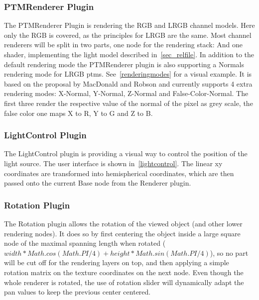 \subsubsection{PTMRenderer Plugin}\label{sec_ptmrender}
The PTMRenderer Plugin is rendering the RGB and LRGB channel
models. Here only the RGB is covered, as the principles for LRGB are the same.
Most channel renderers will be split in two parts, one node for the rendering
stack:
And one shader, implementing the light model described in~\autoref{sec_relfile}.
In addition to the default rendering mode the PTMRenderer plugin is also
supporting a Normals rendering mode for LRGB ptms. See~\autoref{renderingmodes}
for a visual example. It is based on the proposal by MacDonald and
Robson\cite*{macdonald_polynomial_2010} and currently supports 4 extra rendering
modes: X-Normal, Y-Normal, Z-Normal and False-Color-Normal. The first three
render the respective value of the normal of the pixel as grey scale, the false
color one maps X to R, Y to G and Z to B.

\subsubsection{LightControl Plugin}
The LightControl plugin is providing a visual way to control the position of the
light source. The user interface is shown in~\autoref{lightcontrol}. The
linear xy coordinates are transformed into hemispherical coordinates, which are
then passed onto the current Base node from the Renderer plugin.

\subsubsection{Rotation Plugin}
The Rotation plugin allows the rotation of the viewed object (and other lower
rendering nodes). It does so by first centering the object inside a large square
node of the maximal spanning length when rotated ($width * Math.cos(Math.PI / 4) + height * Math.sin(Math.PI /
  4)$), so no part will be cut off for the rendering layers on top, and then
applying a simple rotation matrix on the texture coordinates on the next node. Even though the whole
renderer is rotated, the use of rotation slider will dynamically adapt the pan
values to keep the previous center centered.


